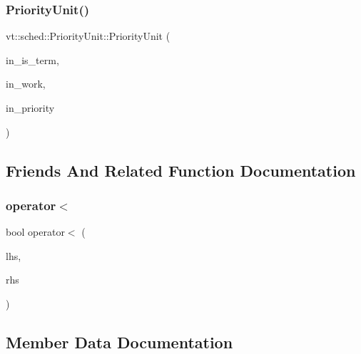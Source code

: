 \subsubsection{\texorpdfstring{Priority\+Unit()}{PriorityUnit()}\hspace{0.1cm}{\footnotesize\ttfamily [2/2]}}
{\footnotesize\ttfamily vt\+::sched\+::\+Priority\+Unit\+::\+Priority\+Unit (\begin{DoxyParamCaption}\item[{bool}]{in\+\_\+is\+\_\+term,  }\item[{\hyperlink{namespacevt_ae0a5a7b18cc99d7b732cb4d44f46b0f3}{Action\+Type}}]{in\+\_\+work,  }\item[{\hyperlink{namespacevt_a86bff9f556eb761b27fc8600d006ac04}{Priority\+Type}}]{in\+\_\+priority }\end{DoxyParamCaption})\hspace{0.3cm}{\ttfamily [inline]}}



\subsection{Friends And Related Function Documentation}
\mbox{\label{structvt_1_1sched_1_1_priority_unit_acb3ebd4c059caed604579a0bbfb8b0e8}} 
\subsubsection{\texorpdfstring{operator$<$}{operator<}}
{\footnotesize\ttfamily bool operator$<$ (\begin{DoxyParamCaption}\item[{\hyperlink{structvt_1_1sched_1_1_priority_unit}{Priority\+Unit} const \&}]{lhs,  }\item[{\hyperlink{structvt_1_1sched_1_1_priority_unit}{Priority\+Unit} const \&}]{rhs }\end{DoxyParamCaption})\hspace{0.3cm}{\ttfamily [friend]}}



\subsection{Member Data Documentation}
\mbox{\label{structvt_1_1sched_1_1_priority_unit_ad8f7fe9067612b7902a6258f3260cfac}} 

